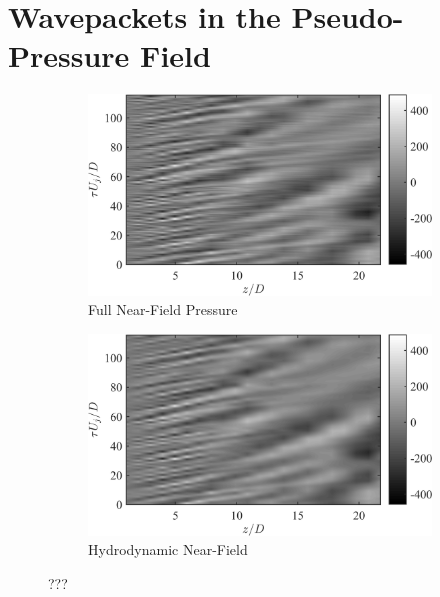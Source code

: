 \section{Wavepackets in the Pseudo-Pressure Field}
\begin{figure}
	\centering
	\begin{subfigure}{.5\textwidth}
		\centering
		\includegraphics[width=0.95\linewidth]{Figures/ch3_S000_r1_full_wvpkts.png}
		\caption{Full Near-Field Pressure}
	\end{subfigure}%
	\begin{subfigure}{.5\textwidth}
		\centering
		\includegraphics[width=0.95\linewidth]{Figures/ch3_S000_r1_hydro_wvpkts.png}
		\caption{Hydrodynamic Near-Field}
	\end{subfigure}
	\caption{???}
	\label{fig:nearfield_wvpkts_filtering}
\end{figure}

